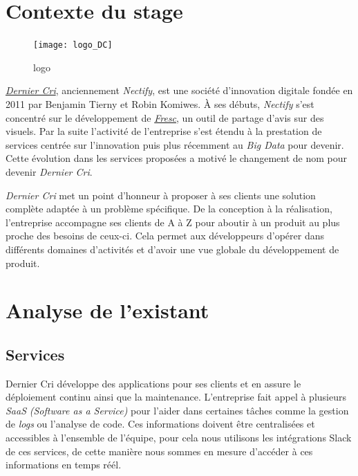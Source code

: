 \newpage

\section{Contexte du stage}\label{contexte-du-stage}

\bigskip

\begin{figure}[htbp]
\centering
\texttt{[image: logo\_DC]}
\caption{logo}
\end{figure}

\bigskip

\emph{\href{http://derniercri.io}{Dernier Cri}}, anciennement
\emph{Nectify}, est une société d'innovation digitale fondée en 2011 par
Benjamin Tierny et Robin Komiwes. À ses débuts, \emph{Nectify} s'est
concentré sur le développement de \emph{\href{http://fre.sc}{Fresc}}, un
outil de partage d'avis sur des visuels. Par la suite l'activité de
l'entreprise s'est étendu à la prestation de services centrée sur
l'innovation puis plus récemment au \emph{Big Data} pour devenir. Cette
évolution dans les services proposées a motivé le changement de nom pour
devenir \emph{Dernier Cri}.

\bigskip

\emph{Dernier Cri} met un point d'honneur à proposer à ses clients une
solution complète adaptée à un problème spécifique. De la conception à
la réalisation, l'entreprise accompagne ses clients de A à Z pour
aboutir à un produit au plus proche des besoins de ceux-ci. Cela permet
aux développeurs d'opérer dans différents domaines d'activités et
d'avoir une vue globale du développement de produit.

\newpage

\section{Analyse de l'existant}\label{analyse-de-lexistant}

\bigskip

\subsection{Services}\label{services}

\bigskip

Dernier Cri développe des applications pour ses clients et en assure le
déploiement continu ainsi que la maintenance. L'entreprise fait appel à
plusieurs \emph{SaaS} \emph{(Software as a Service)} pour l'aider dans
certaines tâches comme la gestion de \emph{logs} ou l'analyse de code.
Ces informations doivent être centralisées et accessibles à l'ensemble
de l'équipe, pour cela nous utilisons les intégrations Slack de ces
services, de cette manière nous sommes en mesure d'accéder à ces
informations en temps réél.

